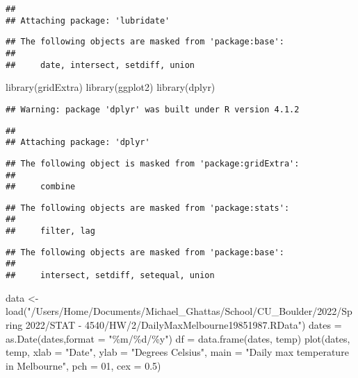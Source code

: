 \documentclass[
]{article}
\newenvironment{Shaded}{\begin{snugshade}}{\end{snugshade}}
\newcommand{\AttributeTok}[1]{\textcolor[rgb]{0.77,0.63,0.00}{#1}}
\newcommand{\DecValTok}[1]{\textcolor[rgb]{0.00,0.00,0.81}{#1}}
\newcommand{\FloatTok}[1]{\textcolor[rgb]{0.00,0.00,0.81}{#1}}
\newcommand{\FunctionTok}[1]{\textcolor[rgb]{0.00,0.00,0.00}{#1}}
\newcommand{\NormalTok}[1]{#1}
\newcommand{\OtherTok}[1]{\textcolor[rgb]{0.56,0.35,0.01}{#1}}
\newcommand{\StringTok}[1]{\textcolor[rgb]{0.31,0.60,0.02}{#1}}
\begin{document}
\begin{verbatim}
## 
## Attaching package: 'lubridate'
\end{verbatim}

\begin{verbatim}
## The following objects are masked from 'package:base':
## 
##     date, intersect, setdiff, union
\end{verbatim}

\begin{Shaded}
\begin{Highlighting}[]
\FunctionTok{library}\NormalTok{(gridExtra)}
\FunctionTok{library}\NormalTok{(ggplot2)}
\FunctionTok{library}\NormalTok{(dplyr)}
\end{Highlighting}
\end{Shaded}

\begin{verbatim}
## Warning: package 'dplyr' was built under R version 4.1.2
\end{verbatim}

\begin{verbatim}
## 
## Attaching package: 'dplyr'
\end{verbatim}

\begin{verbatim}
## The following object is masked from 'package:gridExtra':
## 
##     combine
\end{verbatim}

\begin{verbatim}
## The following objects are masked from 'package:stats':
## 
##     filter, lag
\end{verbatim}

\begin{verbatim}
## The following objects are masked from 'package:base':
## 
##     intersect, setdiff, setequal, union
\end{verbatim}

\begin{Shaded}
\begin{Highlighting}[]
\NormalTok{data }\OtherTok{\textless{}{-}} \FunctionTok{load}\NormalTok{(}\StringTok{"/Users/Home/Documents/Michael\_Ghattas/School/CU\_Boulder/2022/Spring 2022/STAT {-} 4540/HW/2/DailyMaxMelbourne19851987.RData"}\NormalTok{)}
\NormalTok{dates }\OtherTok{=} \FunctionTok{as.Date}\NormalTok{(dates,}\AttributeTok{format =} \StringTok{"\%m/\%d/\%y"}\NormalTok{)}
\NormalTok{df }\OtherTok{=} \FunctionTok{data.frame}\NormalTok{(dates, temp)}
\FunctionTok{plot}\NormalTok{(dates, temp, }\AttributeTok{xlab =} \StringTok{"Date"}\NormalTok{, }\AttributeTok{ylab =} \StringTok{"Degrees Celsius"}\NormalTok{, }\AttributeTok{main =} \StringTok{"Daily max temperature in Melbourne"}\NormalTok{, }\AttributeTok{pch =} \DecValTok{01}\NormalTok{, }\AttributeTok{cex =} \FloatTok{0.5}\NormalTok{)}
\end{Highlighting}
\end{Shaded}
\end{document}
